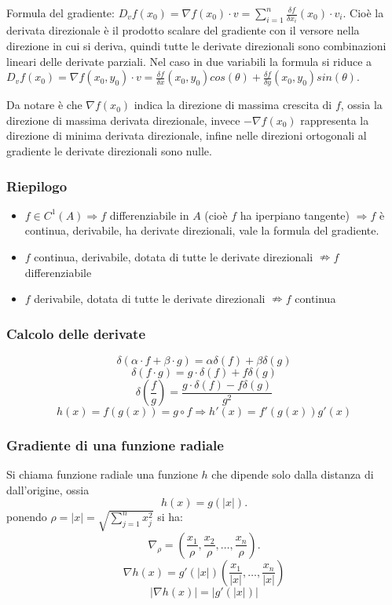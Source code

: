 Formula del gradiente: $D_vf(x_0) = \nabla f(x_0) \cdot v =  \sum_{i=1}^{n} \frac{\delta f}{\delta x_i}(x_0) \cdot  v_i$. Cioè la derivata direzionale è il prodotto scalare del gradiente con il versore nella direzione in cui si deriva, quindi tutte le derivate direzionali sono combinazioni lineari delle derivate parziali. Nel caso in due variabili la formula si riduce a $D_vf(x_0) = \nabla f(x_0,y_0) \cdot v = \frac{\delta f}{\delta x} (x_0,y_0)cos(\theta) + \frac{\delta f}{\delta y}(x_0, y_0) sin(\theta)$.\newline

Da notare è che $\nabla f(x_0)$ indica la direzione di massima crescita di $f$, ossia la direzione di massima derivata direzionale, invece $-\nabla f(x_0)$ rappresenta la direzione di minima derivata direzionale, infine nelle direzioni ortogonali al gradiente le derivate direzionali sono nulle.
\subsubsection*{Riepilogo}
\begin{itemize}
    \item $f \in C^1(A) \Rightarrow f$ differenziabile in $A$ (cioè $f$ ha iperpiano tangente) $\Rightarrow f$ è continua, derivabile, ha derivate direzionali, vale la formula del gradiente.
    \item $f$ continua, derivabile, dotata di tutte le derivate direzionali $\nRightarrow f$ differenziabile
    \item $f$ derivabile, dotata di tutte le derivate direzionali $\nRightarrow f$ continua 
\end{itemize}
\subsubsection*{Calcolo delle derivate}
\[
    \delta(\alpha \cdot f + \beta \cdot g) = \alpha \delta(f) + \beta \delta (g)
\]
\[
    \delta(f \cdot  g) = g \cdot \delta(f) + f \delta(g)
\]
\[
    \delta(\frac{f}{g}) = \frac{ g \cdot \delta(f) - f \delta(g)}{g^2}
\]
\[
    h(x) = f(g(x)) = g \circ f \Rightarrow h'(x) = f'(g(x)) g'(x)
\]
\subsubsection*{Gradiente di una funzione radiale}
Si chiama funzione radiale una funzione $h$ che dipende solo dalla distanza di dall'origine, ossia
\[
    h(x) = g(|x|).
\]
ponendo $\rho = |x| = \sqrt{\sum_{j=1}^{n}x_j^2}$ si ha:
\[
    \nabla_\rho = ( \frac{x_1}{\rho}, \frac{x_2}{\rho}, \dots, \frac{x_n}{\rho}).
\]
\[
    \nabla h(x) = g'(|x|)( \frac{x_1}{|x|}, \dots, \frac{x_n}{|x|})
\]
\[
    |\nabla h(x)| = |g'(|x|)|
\]
